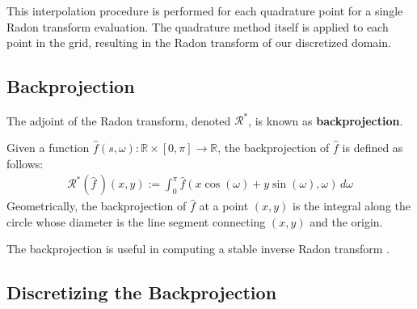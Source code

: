 This interpolation procedure is performed for each quadrature point for a single Radon transform evaluation.
The quadrature method itself is applied to each point in the grid, resulting in the Radon transform of our discretized domain.

\subsection{Backprojection}

The adjoint of the Radon transform, denoted $\mathcal{R}^{*}$, is known as \textbf{backprojection}. 
\par 
Given a function $\widehat{f}(s, \omega): \mathbb{R} \times \left[ 0, \pi \right] \rightarrow \mathbb{R}$, the backprojection of $\widehat{f}$ is defined as follows:
\begin{align*}
    \mathcal{R}^{*} \left( \widehat{f} \, \right) (x, y) := \int_{0}^{\pi} \widehat{f} \left( x \cos \left( \omega \right) + y \sin \left( \omega \right), \omega \right) \, d \omega
\end{align*}
Geometrically, the backprojection of $\widehat{f}$ at a point $\left( x, y \right)$ is the integral along the circle whose diameter is the line segment connecting $(x, y)$ and the origin.
\par 
The backprojection is useful in computing a stable inverse Radon transform \cite{Press:4}.

\subsection{Discretizing the Backprojection}

